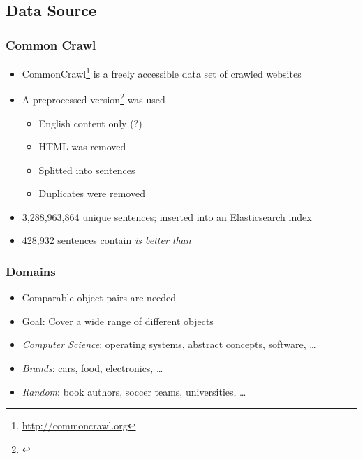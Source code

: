 \documentclass[11pt,aspectratio=169]{beamer}
\begin{document}
    \subsection{Data Source}
    \begin{frame}
        \frametitle{Common Crawl}
        \begin{itemize}
            \item CommonCrawl\footnote{\url{http://commoncrawl.org}} is a freely accessible data set of crawled websites
            \item A preprocessed version\footnote{\cite{Panchenko:2017aa}} was used
            \begin{itemize}
                \item English content only (?)
                \item HTML was removed
                \item Splitted into sentences
                \item Duplicates were removed
            \end{itemize}
            \item 3,288,963,864 unique sentences; inserted into an Elasticsearch index
            \item 428,932 sentences contain \emph{is better than}
        \end{itemize}

    \end{frame}

    \begin{frame}
        \frametitle{Domains}
        \begin{itemize}
            \item Comparable object pairs are needed
            \item Goal: Cover a wide range of different objects
            \item \emph{Computer Science}: operating systems, abstract concepts, software, \ldots
            \item \emph{Brands}: cars, food, electronics, \ldots
            \item \emph{Random}: book authors, soccer teams, universities, \ldots

        \end{itemize}
    \end{frame}
\end{document}

